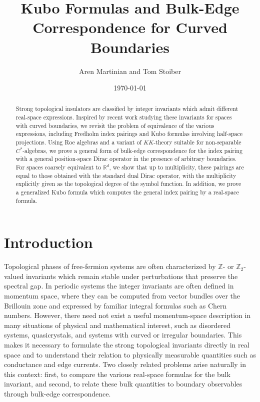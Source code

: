 \documentclass[12pt]{amsart}
\title{Kubo Formulas and Bulk-Edge Correspondence for Curved Boundaries}
\author{Aren Martinian and Tom Stoiber}
\date{\today}
\newcommand{\RM}{{\mathbb R}}
\newcommand{\ZM}{{\mathbb Z}}
\begin{document}
\begin{abstract}
Strong topological insulators are classified by integer invariants which admit different real-space expressions. Inspired by recent work studying these invariants for spaces with curved boundaries, we revisit the problem of equivalence of the various expressions, including Fredholm index pairings and Kubo formulas involving half-space projections. Using Roe algebras and a variant of $KK$-theory suitable for non-separable $C^*$-algebras, we prove a general form of bulk-edge correspondence for the index pairing with a general position-space Dirac operator in the presence of arbitrary boundaries. For spaces coarsely equivalent to $\RM^d$, we show that up to multiplicity, these pairings are equal to those obtained with the standard dual Dirac operator, with the multiplicity explicitly given as the topological degree of the symbol function. In addition, we prove a generalized Kubo formula which computes the general index pairing by a real-space formula.
\end{abstract}

\maketitle
\vspace{-0.75cm}

\tableofcontents


\newpage

\section{Introduction}
Topological phases of free-fermion systems are often characterized by $\ZM$- or $\ZM_2$-valued invariants which remain stable under perturbations that preserve the spectral gap. In periodic systems the integer invariants are often defined in momentum space, where they can be computed from vector bundles over the Brillouin zone and expressed by familiar integral formulas such as Chern numbers. However, there need not exist a useful momentum-space description in many situations of physical and mathematical interest, such as disordered systems, quasicrystals, and systems with curved or irregular boundaries. This makes it necessary to formulate the strong topological invariants directly in real space and to understand their relation to physically measurable quantities such as conductance and edge currents. Two closely related problems arise naturally in this context: first, to compare the various real-space formulas for the bulk invariant, and second, to relate these bulk quantities to boundary observables through bulk-edge correspondence.
\end{document}
